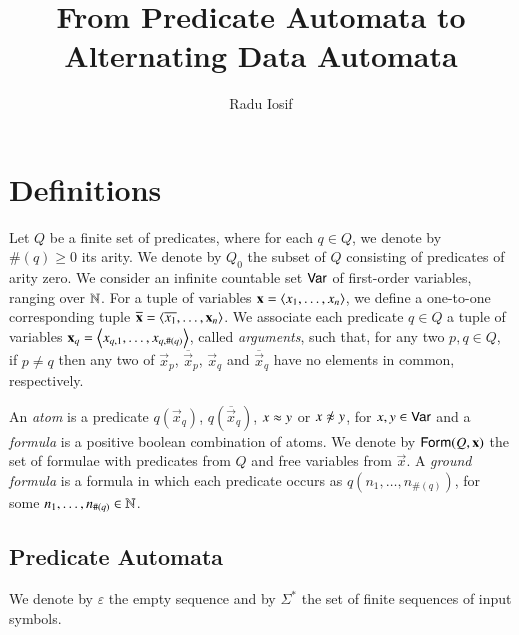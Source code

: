 \documentclass{llncs}
\begin{document}

\title{From Predicate Automata to Alternating Data Automata}

\author{Radu Iosif}
\maketitle

\section{Definitions}

Let $Q$ be a finite set of predicates, where for each $q \in Q$, we
denote by $\#(q)\geq0$ its arity. We denote by $Q_0$ the subset of $Q$
consisting of predicates of arity zero. We consider an infinite
countable set $\mathsf{Var}$ of first-order variables, ranging over
${\bf \mathbb{N}}$. For a tuple of variables $\mathbf x = \left\langle x_1,\ldots,x_n \right\rangle$,
we define a one-to-one corresponding tuple $\overline{\mathbf x} =
\left\langle \overline{x_1},\ldots,\mathbf x_n \right\rangle$. We associate each predicate
$q \in Q$ a tuple of variables $\mathbf x_q = \left\langle x_{q,1}, \ldots,
  x_{q,\#(q)} \right\rangle$, called \emph{arguments}, such that, for any two $p,q
\in Q$, if $p \neq q$ then any two of $\vec{x}_p$,
$\overline{\vec{x}}_p$, $\vec{x}_q$ and $\overline{\vec{x}}_q$ have no
elements in common, respectively.

An \emph{atom} is a predicate $q(\vec{x}_q)$,
$q(\overline{\vec{x}}_q)$, $x \approx y$ or $x \not\teq y$, for $x,y \in
\mathsf{Var}$ and a \emph{formula} is a positive boolean combination of
atoms. We denote by $\mathsf{Form}(Q,\mathbf x)$ the set of formulae with
predicates from $Q$ and free variables from $\vec{x}$. A \emph{ground
  formula} is a formula in which each predicate occurs as
$q(n_1,\ldots,n_{\#(q)})$, for some $n_1,\ldots,n_{\#(q)} \in {\bf \mathbb{N}}$. 

\subsection{Predicate Automata}

We denote by $\varepsilon$ the empty sequence and by $\Sigma^*$ the
set of finite sequences of input symbols.
\end{document}

